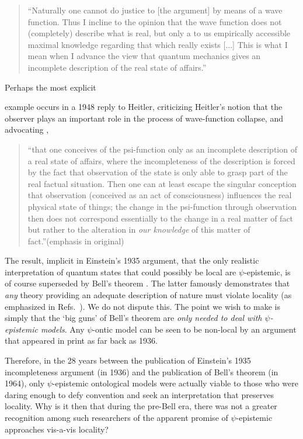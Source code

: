 \documentclass[aps,nofootinbib,12pt]{revtex4}
\begin{document}
\begin{quote}
``Naturally one cannot do justice to [the argument] by means of a
wave function. Thus I incline to the opinion that the wave function
does not (completely) describe what is real, but only a to us
empirically accessible maximal knowledge regarding that which really
exists [...] This is what I mean when I advance the view that
quantum mechanics gives an incomplete description of the real state
of affairs.''
\end{quote}

Perhaps the most explicit \strut example occurs in a 1948 reply to
Heitler, criticizing Heitler's notion that the observer plays an
important role in the process of wave-function collapse, and
advocating \cite{EtoHeitler},

\begin{quote}
\textquotedblleft that one conceives of the psi-function only as an
incomplete description of a real state of affairs, where the
incompleteness of the description is forced by the fact that
observation of the state is only able to grasp part of the real
factual situation. Then one can at least escape the singular
conception that observation (conceived as an act of consciousness)
influences the real physical state of things; the change in the
psi-function through observation then does not correspond
essentially to the change in a real matter of fact but rather to the
alteration in \textit{our knowledge} of this matter of
fact.\textquotedblright (emphasis in original)
\end{quote}


The result, implicit in Einstein's 1935 argument, that the only
realistic interpretation of quantum states that could possibly be
local are $\psi$-epistemic, is of course superseded by Bell's
theorem \cite{Bell_locality}. The latter famously demonstrates that
\textit{any} theory providing an adequate description of nature must
violate locality (as emphasized in
Refs.~\cite{norsen_blrealism,norsen_epr}). We do not dispute this.
The point we wish to make is simply that the `big guns' of Bell's
theorem are \textit{only needed to deal with $\psi $-epistemic
models}. Any $\psi$-ontic model can be seen to be non-local by an
argument that appeared in print as far back as 1936.

Therefore, in the 28 years between the publication of Einstein's
1935 incompleteness argument (in 1936) and the publication of Bell's
theorem (in 1964), only $\psi$-epistemic ontological models were
actually viable to those who were daring enough to defy convention
and seek an interpretation that preserves locality. Why is it then
that during the pre-Bell era, there was not a greater recognition
among such researchers of the apparent promise of $\psi$-epistemic
approaches vis-a-vis locality?
\end{document}
